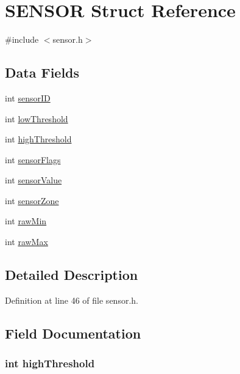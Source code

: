 \hypertarget{struct_s_e_n_s_o_r}{
\section{SENSOR Struct Reference}
\label{struct_s_e_n_s_o_r}
}


{\ttfamily \#include $<$sensor.h$>$}

\subsection*{Data Fields}
\begin{DoxyCompactItemize}
\item 
int \hyperlink{struct_s_e_n_s_o_r_a4f5a5e2cb7ee061dd0bd29b7086d89ac}{sensorID}
\item 
int \hyperlink{struct_s_e_n_s_o_r_adee8a51df0a70d2da05676949d00739c}{lowThreshold}
\item 
int \hyperlink{struct_s_e_n_s_o_r_a8317c657dcd15e5daf27c5df5c9bc13d}{highThreshold}
\item 
int \hyperlink{struct_s_e_n_s_o_r_a7ec77f6117dfdcd4c1716ad10b6e8fe7}{sensorFlags}
\item 
int \hyperlink{struct_s_e_n_s_o_r_abc6f4a0d968d01ae532d5df65e89439b}{sensorValue}
\item 
int \hyperlink{struct_s_e_n_s_o_r_a1ca477e768ccbd326c7ec16a5a65bce4}{sensorZone}
\item 
int \hyperlink{struct_s_e_n_s_o_r_a9950c3a4594e60d047b85d20396b3be7}{rawMin}
\item 
int \hyperlink{struct_s_e_n_s_o_r_a41342808d68e41ec08389c2b11caa6e5}{rawMax}
\end{DoxyCompactItemize}


\subsection{Detailed Description}


Definition at line 46 of file sensor.h.



\subsection{Field Documentation}
\hypertarget{struct_s_e_n_s_o_r_a8317c657dcd15e5daf27c5df5c9bc13d}{
\subsubsection[{highThreshold}]{\setlength{\rightskip}{0pt plus 5cm}int {\bf highThreshold}}}
\label{struct_s_e_n_s_o_r_a8317c657dcd15e5daf27c5df5c9bc13d}


